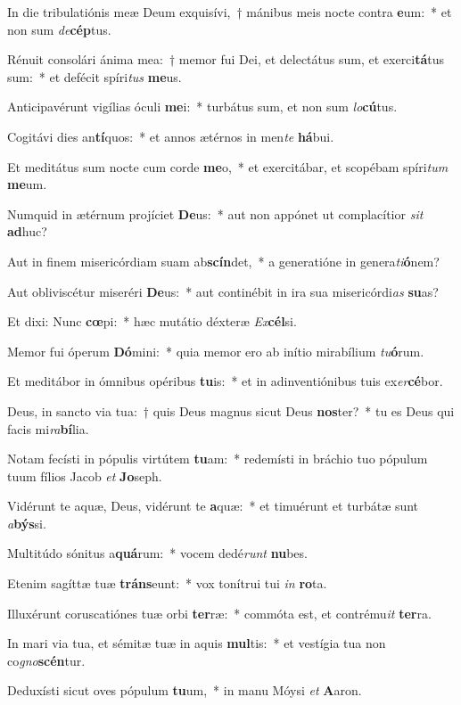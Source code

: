 \item In die tribulatiónis meæ Deum exquisívi,~† mánibus meis nocte contra \textbf{e}um:~* et non sum \textit{de}\textbf{cép}tus.
\item Rénuit consolári ánima mea:~† memor fui Dei, et delectátus sum, et exerci\textbf{tá}tus sum:~* et defécit spíri\textit{tus} \textbf{me}us.
\item Anticipavérunt vigílias óculi \textbf{me}i:~* turbátus sum, et non sum \textit{lo}\textbf{cú}tus.
\item Cogitávi dies an\textbf{tí}quos:~* et annos ætérnos in men\textit{te} \textbf{há}bui.
\item Et meditátus sum nocte cum corde \textbf{me}o,~* et exercitábar, et scopébam spíri\textit{tum} \textbf{me}um.
\item Numquid in ætérnum projíciet \textbf{De}us:~* aut non appónet ut complacítior \textit{sit} \textbf{ad}huc?
\item Aut in finem misericórdiam suam ab\textbf{scín}det,~* a generatióne in genera\textit{ti}\textbf{ó}nem?
\item Aut obliviscétur miseréri \textbf{De}us:~* aut continébit in ira sua misericórdi\textit{as} \textbf{su}as?
\item Et dixi: Nunc \textbf{cœ}pi:~* hæc mutátio déxteræ \textit{Ex}\textbf{cél}si.
\item Memor fui óperum \textbf{Dó}mini:~* quia memor ero ab inítio mirabílium \textit{tu}\textbf{ó}rum.
\item Et meditábor in ómnibus opéribus \textbf{tu}is:~* et in adinventiónibus tuis ex\textit{er}\textbf{cé}bor.
\item Deus, in sancto via tua:~† quis Deus magnus sicut Deus \textbf{nos}ter?~* tu es Deus qui facis mi\textit{ra}\textbf{bí}lia.
\item Notam fecísti in pópulis virtútem \textbf{tu}am:~* redemísti in bráchio tuo pópulum tuum fílios Jacob \textit{et} \textbf{Jo}seph.
\item Vidérunt te aquæ, Deus, vidérunt te \textbf{a}quæ:~* et timuérunt et turbátæ sunt \textit{a}\textbf{býs}si.
\item Multitúdo sónitus a\textbf{quá}rum:~* vocem dedé\textit{runt} \textbf{nu}bes.
\item Etenim sagíttæ tuæ \textbf{tráns}eunt:~* vox tonítrui tui \textit{in} \textbf{ro}ta.
\item Illuxérunt coruscatiónes tuæ orbi \textbf{ter}ræ:~* commóta est, et contrému\textit{it} \textbf{ter}ra.
\item In mari via tua, et sémitæ tuæ in aquis \textbf{mul}tis:~* et vestígia tua non co\textit{gno}\textbf{scén}tur.
\item Deduxísti sicut oves pópulum \textbf{tu}um,~* in manu Móysi \textit{et} \textbf{A}aron.
